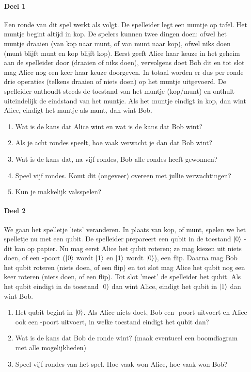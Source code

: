 \documentclass[../../main.tex]{subfiles}
\begin{document}
\paragraph*{Deel 1}
Een ronde van dit spel werkt als volgt. De spelleider legt een muntje op tafel. Het muntje begint altijd in kop. De spelers kunnen twee dingen doen: ofwel het muntje draaien (van kop naar munt, of van munt naar kop), ofwel niks doen (munt blijft munt en kop blijft kop). Eerst geeft Alice haar keuze in het geheim aan de spelleider door (draaien of niks doen), vervolgens doet Bob dit en tot slot mag Alice nog een keer haar keuze doorgeven. In totaal worden er dus per ronde drie operaties (telkens draaien of niets doen) op het muntje uitgevoerd. De spelleider onthoudt steeds de toestand van het muntje (kop/munt) en onthult uiteindelijk de eindstand van het muntje. Als het muntje eindigt in kop, dan wint Alice, eindigt het muntje als munt, dan wint Bob.
\begin{enumerate}
\item Wat is de kans dat Alice wint en wat is de kans dat Bob wint?
\item Als je acht rondes speelt, hoe vaak verwacht je dan dat Bob wint?
\item Wat is de kans dat, na vijf rondes, Bob alle rondes heeft gewonnen?
\item Speel vijf rondes. Komt dit (ongeveer) overeen met jullie verwachtingen?
\item Kun je makkelijk valsspelen?
\end{enumerate}

\paragraph*{Deel 2}
We gaan het spelletje 'iets' veranderen. In plaats van kop, of munt, spelen we het spelletje nu met een qubit. De spelleider prepareert een qubit in de toestand $\ket{0}$ - dit kan op papier. Nu mag eerst Alice het qubit roteren; ze mag kiezen uit niets doen, of een -poort ($\ket{0}$ wordt $\ket{1}$ en $\ket{1}$ wordt $\ket{0}$), een flip. Daarna mag Bob het qubit roteren (niets doen, of een flip) en tot slot mag Alice het qubit nog een keer roteren (niets doen, of een flip). Tot slot 'meet' de spelleider het qubit. Als het qubit eindigt in de toestand $\ket{0}$ dan wint Alice, eindigt het qubit in $\ket{1}$ dan wint Bob.

\begin{enumerate}
\item Het qubit begint in $\ket{0}$. Als Alice niets doet, Bob een -poort uitvoert en Alice ook een -poort uitvoert, in welke toestand eindigt het qubit dan?
\item Wat is de kans dat Bob de ronde wint? (maak eventueel een boomdiagram met alle mogelijkheden)
\item Speel vijf rondes van het spel. Hoe vaak won Alice, hoe vaak won Bob?
\end{enumerate}
\end{document}
